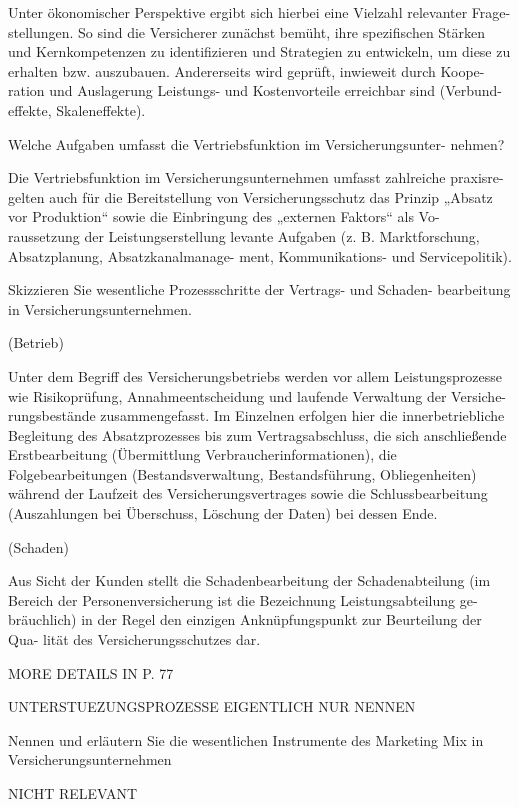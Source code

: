 Unter ökonomischer Perspektive ergibt sich hierbei eine Vielzahl relevanter Frage-
stellungen. So sind die Versicherer zunächst bemüht, ihre spezifischen Stärken
und Kernkompetenzen zu identifizieren und Strategien zu entwickeln, um diese
zu erhalten bzw. auszubauen. Andererseits wird geprüft, inwieweit durch Koope-
ration und Auslagerung Leistungs- und Kostenvorteile erreichbar sind (Verbund-
effekte, Skaleneffekte).




Welche Aufgaben umfasst die Vertriebsfunktion im Versicherungsunter-
nehmen?

Die Vertriebsfunktion im Versicherungsunternehmen umfasst zahlreiche praxisre-
gelten auch für die Bereitstellung von Versicherungsschutz das Prinzip
„Absatz vor Produktion“ sowie die Einbringung des „externen Faktors“ als Vo-
raussetzung der Leistungserstellung
levante Aufgaben (z. B. Marktforschung, Absatzplanung, Absatzkanalmanage-
ment, Kommunikations- und Servicepolitik).



Skizzieren Sie wesentliche Prozessschritte der Vertrags- und Schaden-
bearbeitung in Versicherungsunternehmen.

(Betrieb)

Unter dem Begriff des Versicherungsbetriebs werden vor allem Leistungsprozesse
wie Risikoprüfung, Annahmeentscheidung und laufende Verwaltung der Versiche-
rungsbestände zusammengefasst. Im Einzelnen erfolgen hier die innerbetriebliche
Begleitung des Absatzprozesses bis zum Vertragsabschluss, die sich anschließende
Erstbearbeitung (Übermittlung Verbraucherinformationen), die Folgebearbeitungen 
(Bestandsverwaltung, Bestandsführung, Obliegenheiten) während der Laufzeit des Versicherungsvertrages 
sowie die Schlussbearbeitung (Auszahlungen bei Überschuss, Löschung der Daten) bei dessen Ende.

(Schaden)

Aus Sicht der Kunden stellt die Schadenbearbeitung der Schadenabteilung (im
Bereich der Personenversicherung ist die Bezeichnung Leistungsabteilung ge-
bräuchlich) in der Regel den einzigen Anknüpfungspunkt zur Beurteilung der Qua-
lität des Versicherungsschutzes dar.

MORE DETAILS IN P. 77


UNTERSTUEZUNGSPROZESSE EIGENTLICH NUR NENNEN  

Nennen und erläutern Sie die wesentlichen Instrumente des Marketing
Mix in Versicherungsunternehmen

NICHT RELEVANT



